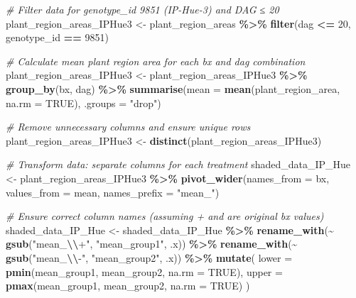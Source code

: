 \documentclass[
  11pt,
]{article}
\newenvironment{Shaded}{\begin{snugshade}}{\end{snugshade}}
\newcommand{\AttributeTok}[1]{\textcolor[rgb]{0.13,0.29,0.53}{#1}}
\newcommand{\CommentTok}[1]{\textcolor[rgb]{0.56,0.35,0.01}{\textit{#1}}}
\newcommand{\ConstantTok}[1]{\textcolor[rgb]{0.56,0.35,0.01}{#1}}
\newcommand{\DecValTok}[1]{\textcolor[rgb]{0.00,0.00,0.81}{#1}}
\newcommand{\FunctionTok}[1]{\textcolor[rgb]{0.13,0.29,0.53}{\textbf{#1}}}
\newcommand{\NormalTok}[1]{#1}
\newcommand{\OtherTok}[1]{\textcolor[rgb]{0.56,0.35,0.01}{#1}}
\newcommand{\SpecialCharTok}[1]{\textcolor[rgb]{0.81,0.36,0.00}{\textbf{#1}}}
\newcommand{\StringTok}[1]{\textcolor[rgb]{0.31,0.60,0.02}{#1}}
\begin{document}
\begin{Shaded}
\begin{Highlighting}[]
\CommentTok{\# Filter data for genotype\_id 9851 (IP{-}Hue{-}3) and DAG ≤ 20}
\NormalTok{plant\_region\_areas\_IPHue3 }\OtherTok{\textless{}{-}}\NormalTok{ plant\_region\_areas }\SpecialCharTok{\%\textgreater{}\%}
  \FunctionTok{filter}\NormalTok{(dag }\SpecialCharTok{\textless{}=} \DecValTok{20}\NormalTok{, genotype\_id }\SpecialCharTok{==} \DecValTok{9851}\NormalTok{)}

\CommentTok{\# Calculate mean plant region area for each bx and dag combination}
\NormalTok{plant\_region\_areas\_IPHue3 }\OtherTok{\textless{}{-}}\NormalTok{ plant\_region\_areas\_IPHue3 }\SpecialCharTok{\%\textgreater{}\%}
  \FunctionTok{group\_by}\NormalTok{(bx, dag) }\SpecialCharTok{\%\textgreater{}\%}
  \FunctionTok{summarise}\NormalTok{(}\AttributeTok{mean =} \FunctionTok{mean}\NormalTok{(plant\_region\_area, }\AttributeTok{na.rm =} \ConstantTok{TRUE}\NormalTok{), }\AttributeTok{.groups =} \StringTok{"drop"}\NormalTok{)}

\CommentTok{\# Remove unnecessary columns and ensure unique rows}
\NormalTok{plant\_region\_areas\_IPHue3 }\OtherTok{\textless{}{-}} \FunctionTok{distinct}\NormalTok{(plant\_region\_areas\_IPHue3)}

\CommentTok{\# Transform data: separate columns for each treatment}
\NormalTok{shaded\_data\_IP\_Hue }\OtherTok{\textless{}{-}}\NormalTok{ plant\_region\_areas\_IPHue3 }\SpecialCharTok{\%\textgreater{}\%}
  \FunctionTok{pivot\_wider}\NormalTok{(}\AttributeTok{names\_from =}\NormalTok{ bx, }\AttributeTok{values\_from =}\NormalTok{ mean, }\AttributeTok{names\_prefix =} \StringTok{"mean\_"}\NormalTok{)}

\CommentTok{\# Ensure correct column names (assuming \textasciigrave{}+\textasciigrave{} and \textasciigrave{}{-}\textasciigrave{} are original bx values)}
\NormalTok{shaded\_data\_IP\_Hue }\OtherTok{\textless{}{-}}\NormalTok{ shaded\_data\_IP\_Hue }\SpecialCharTok{\%\textgreater{}\%}
  \FunctionTok{rename\_with}\NormalTok{(}\SpecialCharTok{\textasciitilde{}} \FunctionTok{gsub}\NormalTok{(}\StringTok{"mean\_}\SpecialCharTok{\textbackslash{}\textbackslash{}}\StringTok{+"}\NormalTok{, }\StringTok{"mean\_group1"}\NormalTok{, .x)) }\SpecialCharTok{\%\textgreater{}\%}
  \FunctionTok{rename\_with}\NormalTok{(}\SpecialCharTok{\textasciitilde{}} \FunctionTok{gsub}\NormalTok{(}\StringTok{"mean\_}\SpecialCharTok{\textbackslash{}\textbackslash{}}\StringTok{{-}"}\NormalTok{, }\StringTok{"mean\_group2"}\NormalTok{, .x)) }\SpecialCharTok{\%\textgreater{}\%}
  \FunctionTok{mutate}\NormalTok{(}
    \AttributeTok{lower =} \FunctionTok{pmin}\NormalTok{(mean\_group1, mean\_group2, }\AttributeTok{na.rm =} \ConstantTok{TRUE}\NormalTok{),}
    \AttributeTok{upper =} \FunctionTok{pmax}\NormalTok{(mean\_group1, mean\_group2, }\AttributeTok{na.rm =} \ConstantTok{TRUE}\NormalTok{)}
\NormalTok{  )}


\end{Highlighting}
\end{Shaded}
\end{document}
